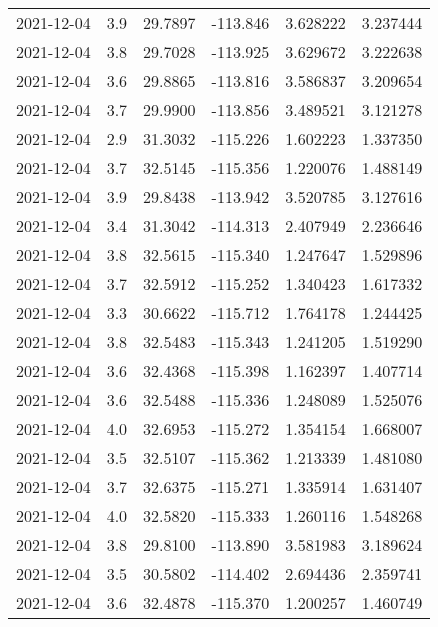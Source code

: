 \begin{tabular}{lrrrrr}
2021-12-04 &       3.9 &  29.7897 &  -113.846 &         3.628222 &         3.237444 \\
2021-12-04 &       3.8 &  29.7028 &  -113.925 &         3.629672 &         3.222638 \\
2021-12-04 &       3.6 &  29.8865 &  -113.816 &         3.586837 &         3.209654 \\
2021-12-04 &       3.7 &  29.9900 &  -113.856 &         3.489521 &         3.121278 \\
2021-12-04 &       2.9 &  31.3032 &  -115.226 &         1.602223 &         1.337350 \\
2021-12-04 &       3.7 &  32.5145 &  -115.356 &         1.220076 &         1.488149 \\
2021-12-04 &       3.9 &  29.8438 &  -113.942 &         3.520785 &         3.127616 \\
2021-12-04 &       3.4 &  31.3042 &  -114.313 &         2.407949 &         2.236646 \\
2021-12-04 &       3.8 &  32.5615 &  -115.340 &         1.247647 &         1.529896 \\
2021-12-04 &       3.7 &  32.5912 &  -115.252 &         1.340423 &         1.617332 \\
2021-12-04 &       3.3 &  30.6622 &  -115.712 &         1.764178 &         1.244425 \\
2021-12-04 &       3.8 &  32.5483 &  -115.343 &         1.241205 &         1.519290 \\
2021-12-04 &       3.6 &  32.4368 &  -115.398 &         1.162397 &         1.407714 \\
2021-12-04 &       3.6 &  32.5488 &  -115.336 &         1.248089 &         1.525076 \\
2021-12-04 &       4.0 &  32.6953 &  -115.272 &         1.354154 &         1.668007 \\
2021-12-04 &       3.5 &  32.5107 &  -115.362 &         1.213339 &         1.481080 \\
2021-12-04 &       3.7 &  32.6375 &  -115.271 &         1.335914 &         1.631407 \\
2021-12-04 &       4.0 &  32.5820 &  -115.333 &         1.260116 &         1.548268 \\
2021-12-04 &       3.8 &  29.8100 &  -113.890 &         3.581983 &         3.189624 \\
2021-12-04 &       3.5 &  30.5802 &  -114.402 &         2.694436 &         2.359741 \\
2021-12-04 &       3.6 &  32.4878 &  -115.370 &         1.200257 &         1.460749 \\

\end{tabular}
